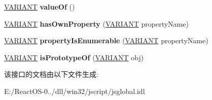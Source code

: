 \begin{DoxyCompactItemize}
\mbox{\label{interface_j_s_global_1_1_number_instance_a3777d24b4abef48e831d6bb28fee641d}} 
\hyperlink{structtag_v_a_r_i_a_n_t}{V\+A\+R\+I\+A\+NT} {\bfseries value\+Of} ()
\item 
\mbox{\label{interface_j_s_global_1_1_number_instance_a369fb027e2eeafe36020bab528fa92f4}} 
\hyperlink{structtag_v_a_r_i_a_n_t}{V\+A\+R\+I\+A\+NT} {\bfseries has\+Own\+Property} (\hyperlink{structtag_v_a_r_i_a_n_t}{V\+A\+R\+I\+A\+NT} property\+Name)
\item 
\mbox{\label{interface_j_s_global_1_1_number_instance_ae7b885c18a1d4c7b4856c9292310112a}} 
\hyperlink{structtag_v_a_r_i_a_n_t}{V\+A\+R\+I\+A\+NT} {\bfseries property\+Is\+Enumerable} (\hyperlink{structtag_v_a_r_i_a_n_t}{V\+A\+R\+I\+A\+NT} property\+Name)
\item 
\mbox{\label{interface_j_s_global_1_1_number_instance_a591e33b312516f49f8b0df74256fbaa2}} 
\hyperlink{structtag_v_a_r_i_a_n_t}{V\+A\+R\+I\+A\+NT} {\bfseries is\+Prototype\+Of} (\hyperlink{structtag_v_a_r_i_a_n_t}{V\+A\+R\+I\+A\+NT} obj)
\end{DoxyCompactItemize}


该接口的文档由以下文件生成\+:\begin{DoxyCompactItemize}
\item 
E\+:/\+React\+O\+S-\/0../dll/win32/jscript/jsglobal.\+idl\end{DoxyCompactItemize}
